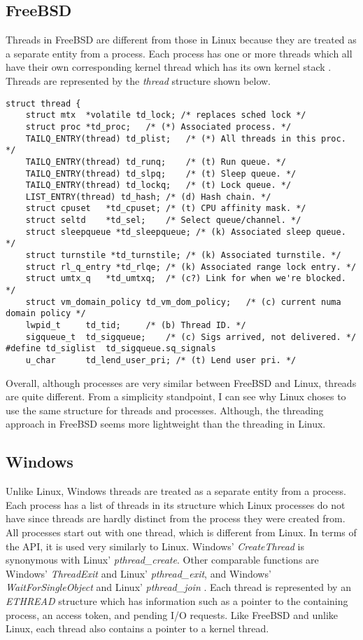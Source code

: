 \documentclass[10pt,draftclsnofoot,onecolumn,journal,compsoc]{IEEEtran}
\begin{document}
\subsection{FreeBSD}
Threads in FreeBSD are different from those in Linux because they are treated as a separate entity from a process. Each process has one or more threads which all have their own corresponding kernel thread which has its own kernel stack \cite{bsd_thrd}. Threads are represented by the \textit{thread} structure shown below.

\begin{lstlisting}[caption={Excerpt from \textit{thread} structure \cite{bsd_thrd2}}]
struct thread {
	struct mtx	*volatile td_lock; /* replaces sched lock */
	struct proc	*td_proc;	/* (*) Associated process. */
	TAILQ_ENTRY(thread) td_plist;	/* (*) All threads in this proc. */
	TAILQ_ENTRY(thread) td_runq;	/* (t) Run queue. */
	TAILQ_ENTRY(thread) td_slpq;	/* (t) Sleep queue. */
	TAILQ_ENTRY(thread) td_lockq;	/* (t) Lock queue. */
	LIST_ENTRY(thread) td_hash;	/* (d) Hash chain. */
	struct cpuset	*td_cpuset;	/* (t) CPU affinity mask. */
	struct seltd	*td_sel;	/* Select queue/channel. */
	struct sleepqueue *td_sleepqueue; /* (k) Associated sleep queue. */
	struct turnstile *td_turnstile;	/* (k) Associated turnstile. */
	struct rl_q_entry *td_rlqe;	/* (k) Associated range lock entry. */
	struct umtx_q   *td_umtxq;	/* (c?) Link for when we're blocked. */
	struct vm_domain_policy td_vm_dom_policy;	/* (c) current numa domain policy */
	lwpid_t		td_tid;		/* (b) Thread ID. */
	sigqueue_t	td_sigqueue;	/* (c) Sigs arrived, not delivered. */
#define	td_siglist	td_sigqueue.sq_signals
	u_char		td_lend_user_pri; /* (t) Lend user pri. */

\end{lstlisting}

Overall, although processes are very similar between FreeBSD and Linux, threads are quite different. From a simplicity standpoint, I can see why Linux choses to use the same structure for threads and processes. Although, the threading approach in FreeBSD seems more lightweight than the threading in Linux. 

\subsection{Windows}
Unlike Linux, Windows threads are treated as a separate entity from a process. Each process has a list of threads in its structure which Linux processes do not have since threads are hardly distinct from the process they were created from. All processes start out with one thread, which is different from Linux. In terms of the API, it is used very similarly to Linux. Windows' \textit{CreateThread} is synonymous with Linux' \textit{pthread\_create}. Other comparable functions are Windows' \textit{ThreadExit} and Linux' \textit{pthread\_exit}, and Windows' \textit{WaitForSingleObject} and Linux' \textit{pthread\_join} \cite{win_thrd}. Each thread is represented by an \textit{ETHREAD} structure which has information such as a pointer to the containing process, an access token, and pending I/O requests. Like FreeBSD and unlike Linux, each thread also contains a pointer to a kernel thread.
\end{document}
